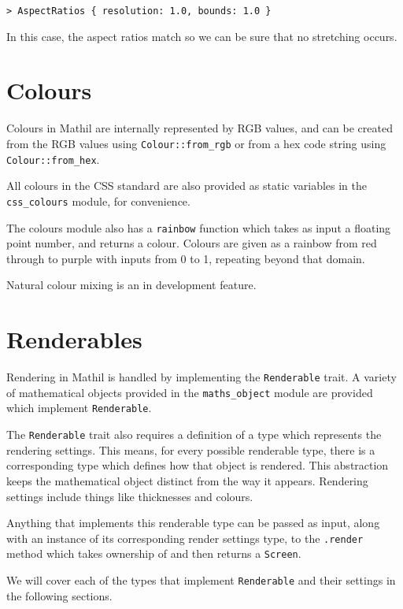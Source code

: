 \begin{lstlisting}
> AspectRatios { resolution: 1.0, bounds: 1.0 }
\end{lstlisting}

In this case, the aspect ratios match so we can be sure that no stretching occurs.

\section{Colours}

Colours in Mathil are internally represented by RGB values, and can be created from the RGB values using \verb|Colour::from_rgb| or from a hex code string using \verb|Colour::from_hex|.

All colours in the CSS standard are also provided as static variables in the \verb|css_colours| module, for convenience.

The colours module also has a \verb|rainbow| function which takes as input a floating point number, and returns a colour. Colours are given as a rainbow from red through to purple with inputs from 0 to 1, repeating beyond that domain.

Natural colour mixing is an in development feature.

\section{Renderables}

Rendering in Mathil is handled by implementing the \verb|Renderable| trait. A variety of mathematical objects provided in the \verb|maths_object| module are provided which implement \verb|Renderable|.

The \verb|Renderable| trait also requires a definition of a type which represents the rendering settings. This means, for every possible renderable type, there is a corresponding type which defines how that object is rendered. This abstraction keeps the mathematical object distinct from the way it appears. Rendering settings include things like thicknesses and colours.

Anything that implements this renderable type can be passed as input, along with an instance of its corresponding render settings type, to the \verb|.render| method which takes ownership of and then returns a \verb|Screen|.

We will cover each of the types that implement \verb|Renderable| and their settings in the following sections.

